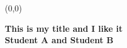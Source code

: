 \documentclass[a0]{a0poster}
\begin{document}

\parindent=0pt
\baselineskip



%
%



\begin{textblock}{24}(0,0)
\begin{center}
\vspace{-0.25in}
\Huge{\textbf{This is my title and I like it}}\\
\vspace{0.35in}
\Large{\textbf{Student A and Student B}}
 \end{center}
\end{textblock}




\end{document}

